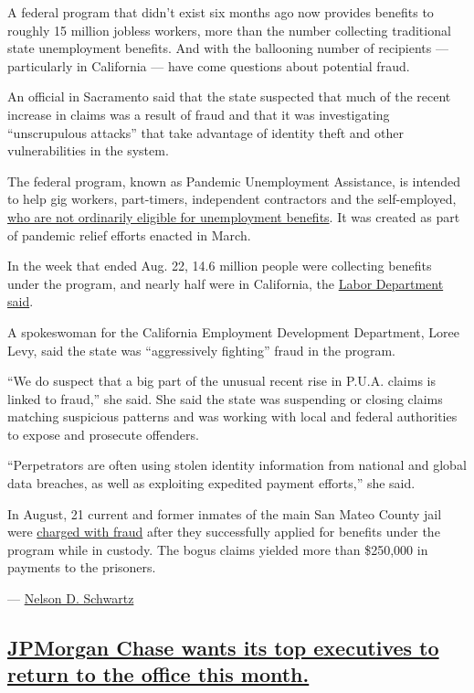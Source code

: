 A federal program that didn't exist six months ago now provides benefits
to roughly 15 million jobless workers, more than the number collecting
traditional state unemployment benefits. And with the ballooning number
of recipients --- particularly in California --- have come questions
about potential fraud.

An official in Sacramento said that the state suspected that much of the
recent increase in claims was a result of fraud and that it was
investigating ``unscrupulous attacks'' that take advantage of identity
theft and other vulnerabilities in the system.

The federal program, known as Pandemic Unemployment Assistance, is
intended to help gig workers, part-timers, independent contractors and
the self-employed,
\href{https://www.nytimes3xbfgragh.onion/article/coronavirus-money-unemployment.html\#link-2f8736c0}{who
are not ordinarily eligible for unemployment benefits}. It was created
as part of pandemic relief efforts enacted in March.

In the week that ended Aug. 22, 14.6 million people were collecting
benefits under the program, and nearly half were in California, the
\href{https://www.dol.gov/ui/data.pdf}{Labor Department said}.

A spokeswoman for the California Employment Development Department,
Loree Levy, said the state was ``aggressively fighting'' fraud in the
program.

``We do suspect that a big part of the unusual recent rise in P.U.A.
claims is linked to fraud,'' she said. She said the state was suspending
or closing claims matching suspicious patterns and was working with
local and federal authorities to expose and prosecute offenders.

``Perpetrators are often using stolen identity information from national
and global data breaches, as well as exploiting expedited payment
efforts,'' she said.

In August, 21 current and former inmates of the main San Mateo County
jail were
\href{https://www.nytimes3xbfgragh.onion/2020/08/17/us/unemployment-fraud-jail-california.html}{charged
with fraud} after they successfully applied for benefits under the
program while in custody. The bogus claims yielded more than \$250,000
in payments to the prisoners.

---
\href{https://www.nytimes3xbfgragh.onion/by/nelson-d-schwartz}{Nelson D.
Schwartz}

\hypertarget{jpmorgan-chase-wants-its-top-executives-to-return-to-the-office-this-month}{%
\subsection{\texorpdfstring{\protect\hyperlink{jpmorgan-chase-wants-its-top-executives-to-return-to-the-office-this-month}{JPMorgan
Chase wants its top executives to return to the office this
month.}}{JPMorgan Chase wants its top executives to return to the office this month.}}\label{jpmorgan-chase-wants-its-top-executives-to-return-to-the-office-this-month}}


